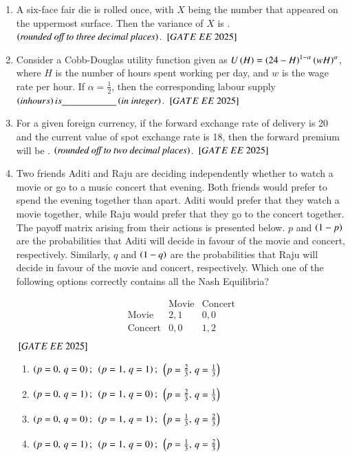 \documentclass[journal,12pt,onecolumn]{IEEEtran}
\theoremstyle{remark}
\begin{document}
\begin{enumerate}
\item A six-face fair die is rolled once, with $X$ being the number that appeared on the uppermost surface. Then the variance of $X$ is \underline{\hspace{2cm}}.  $\left(\textit{rounded off to three decimal places}\right)$.
 $\sbrak{GATE\ EE\ 2025}$\\
\item Consider a Cobb-Douglas utility function given as $U \left(H\right) =  \left(24-H\right)^{1-\alpha} \left(wH\right)^\alpha$, where $H$ is the number of hours spent working per day, and $w$ is the wage rate per hour. If $\alpha = \frac{1}{2}$, then the corresponding labour supply  $\left(in hours\right) is \underline{\hspace{2cm}}  \left(\textit{in integer}\right)$.
 $\sbrak{GATE\ EE\ 2025}$\\
\item For a given foreign currency, if the forward exchange rate of delivery is 20 and the current value of spot exchange rate is 18, then the forward premium will be \underline{\hspace{2cm}}.  $\left(\textit{rounded off to two decimal places}\right)$.
 $\sbrak{GATE\ EE\ 2025}$\\
\item Two friends Aditi and Raju are deciding independently whether to watch a movie or go to a music concert that evening. Both friends would prefer to spend the evening together than apart. Aditi would prefer that they watch a movie together, while Raju would prefer that they go to the concert together. The payoff matrix arising from their actions is presented below. $p$ and $ \left(1-p\right)$ are the probabilities that Aditi will decide in favour of the movie and concert, respectively. Similarly, $q$ and $ \left(1-q\right)$ are the probabilities that Raju will decide in favour of the movie and concert, respectively. Which one of the following options correctly contains all the Nash Equilibria?

\[
\begin{array}{c|c|c}
      & \text{Movie} & \text{Concert} \\
\hline
\text{Movie}   & 2,1 & 0,0 \\
\text{Concert} & 0,0 & 1,2 \\
\end{array}
\]
$\sbrak{GATE\ EE\ 2025}$\\
\begin{enumerate}[label=(\Alph*)]
    \item $ \left(p=0,\, q=0\right);$\, $ \left(p=1,\, q=1\right);$\, $\left( p=\frac{2}{3},\, q=\frac{1}{3} \right)$
    \item $ \left(p=0,\, q=1\right);$\, $ \left(p=1,\, q=0\right);$\,  $\left( p=\frac{2}{3},\, q=\frac{1}{3} \right)$
    \item $ \left(p=0,\, q=0\right);$\, $ \left(p=1,\, q=1\right);$\,  $\left( p=\frac{1}{3},\, q=\frac{2}{3}\right) $
    \item $ \left(p=0,\, q=1\right);$\, $ \left(p=1,\, q=0\right);$\,  $\left( p=\frac{1}{3},\, q=\frac{2}{3} \right)$
\end{enumerate}
 

\end{enumerate}
\end{document}
